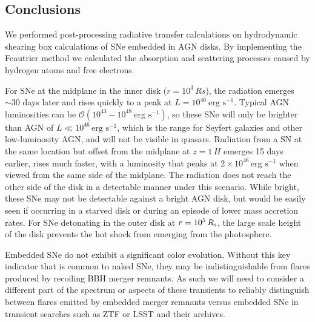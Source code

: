 \subsection{Conclusions} \label{sec:conclusion}

We performed post-processing radiative transfer calculations on hydrodynamic shearing box calculations of SNe embedded in AGN disks.
By implementing the Feautrier method we calculated the absorption and scattering processes caused by hydrogen atoms and free electrons.

For SNe at the midplane in the inner disk ($r=10^3\,Rs$), the radiation emerges $\sim30$ days later and rises quickly to a peak at $L=10^{46}\ \text{erg s}^{-1}$.
Typical AGN luminosities can be $\mathcal{O}(10^{43}-10^{48}\ \text{erg s}^{-1})$, so these SNe will only be brighter than AGN of $L\ll10^{46}\,\text{erg s}^{-1}$, which is the range for Seyfert galaxies and other low-luminosity AGN, and will not be visible in quasars.
Radiation from a SN at the same location but offset from the midplane at $z=1\,H$ emerges 15 days earlier, rises much faster, with a luminosity that peaks at $2 \times 10^{46}\,\text{erg s}^{-1}$ when viewed from the same side of the midplane.
The radiation does not reach the other side of the disk in a detectable manner under this scenario.
While bright, these SNe may not be detectable against a bright AGN disk, but would be easily seen if occurring in a starved disk or during an episode of lower mass accretion rates.
For SNe detonating in the outer disk at $r=10^5\,R_{\rm s}$, the large scale height of the disk prevents the hot shock from emerging from the photosphere.

Embedded SNe do not exhibit a significant color evolution.
Without this key indicator that is common to naked SNe, they may be indistinguishable from flares produced by recoiling BBH merger remnants.
As such we will need to consider a different part of the spectrum or aspects of these transients to reliably distinguish between flares emitted by embedded merger remnants versus embedded SNe in transient searches such as ZTF or LSST and their archives.

